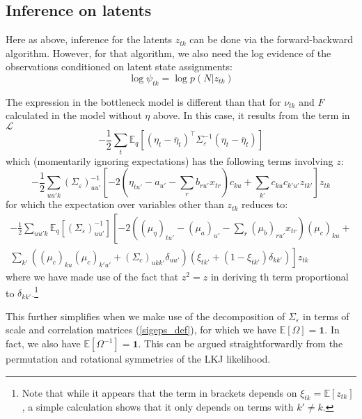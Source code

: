 \documentclass[11pt]{article}
\begin{document}
\subsection{Inference on latents}
Here as above, inference for the latents $z_{tk}$ can be done via the forward-backward algorithm. However, for that algorithm, we also need the log evidence of the observations conditioned on latent state assignments:
\begin{equation}
    \log \psi_{tk} = \log p(N|z_{tk})
\end{equation}

The expression in the bottleneck model is different than that for $\nu_{tk}$ and $F$ calculated in the model without $\eta$ above. In this case, it results from the term in $\mathcal{L}$
\begin{equation}
    - \frac{1}{2} \sum_{t} \mathbb{E}_q \left[
    (\eta_t - \overline{\eta}_t)^\top \Sigma_\varepsilon^{-1}(\eta_t - \overline{\eta}_t) \right]
\end{equation}
which (momentarily ignoring expectations) has the following terms involving $z$:
\begin{equation}
    -\frac{1}{2}\sum_{uu'k}\left(\Sigma_\varepsilon\right)^{-1}_{uu'} \left[-2(\eta_{tu'} - a_{u'} - \sum_r b_{ru'} x_{tr})c_{ku} + \sum_{k'}c_{ku}c_{k'u'}z_{tk'}\right]z_{tk}
\end{equation}
for which the expectation over variables other than $z_{tk}$ reduces to:
\begin{multline}
    -\frac{1}{2}\sum_{uu'k}\mathbb{E}_q\left[\left(\Sigma_\varepsilon\right)^{-1}_{uu'}\right]
    \left[-2\left((\mu_\eta)_{tu'} - (\mu_a)_{u'} - \sum_r (\mu_b)_{ru'} x_{tr}\right)
    (\mu_c)_{ku} + \right. \\
    \left.
    \sum_{k'}((\mu_c)_{ku}(\mu_c)_{k'u'} + (\Sigma_c)_{ukk'}\delta_{uu'})(\xi_{tk'} + (1 - \xi_{tk'})\delta_{kk'})\right]z_{tk}
\end{multline}
where we have made use of the fact that $z^2 = z$ in deriving th term proportional to $\delta_{kk'}$.\footnote{Note that while it appears that the term in brackets depends on $\xi_{tk} = \mathbb{E}[z_{tk}]$, a simple calculation shows that it only depends on terms with $k' \neq k$.}

This further simplifies when we make use of the decomposition of $\Sigma_\varepsilon$ in terms of scale and correlation matrices (\ref{sigeps_def}), for which we have $\mathbb{E}[\Omega] = \mathbf{1}$. In fact, we also have $\mathbb{E}[\Omega^{-1}] = \mathbf{1}$. This can be argued straightforwardly from the permutation and rotational symmetries of the LKJ likelihood.
\end{document}
